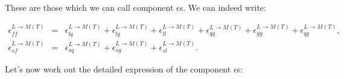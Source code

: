 These are those which we can call component $\epsilon$s. We can indeed write:

\begin{eqnarray}
\epsilon_{ff}^{L \rightarrow M(T)} & = & \epsilon_{lq}^{L \rightarrow M(T)} + \epsilon_{lg}^{L \rightarrow M(T)} + \epsilon_{ll}^{L \rightarrow M(T)} + \epsilon_{qq}^{L \rightarrow M(T)} + \epsilon_{gg}^{L \rightarrow M(T)} + \epsilon_{qg}^{L \rightarrow M(T)},\label{eq:eps9_} \\ 
\epsilon_{sf}^{L \rightarrow M(T)} & = & \epsilon_{sq}^{L \rightarrow M(T)} + \epsilon_{sg}^{L \rightarrow M(T)} + \epsilon_{sl}^{L \rightarrow M(T)}. \label{eq:eps10_}
\end{eqnarray}

Let's now work out the detailed expression of the component $\epsilon$s:

